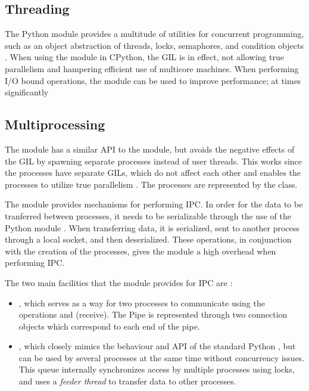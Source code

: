 \subsection{Threading}
The Python  module provides a multitude of utilities for concurrent programming, such as an object abstraction of
threads, locks, semaphores, and condition objects \cite{16_1thtip2d}. When using the  module in CPython, the GIL is in
effect, not allowing true parallelism and hampering efficient use of multicore machines. When performing I/O bound operations, the
 module can be used to improve performance; at times significantly \cite[p. 121-124]{slatkin_2015_effective_ep5swtwbp}

\subsection{Multiprocessing}
The  module has a similar API to the  module, but avoids the negative effects of the GIL by spawning
separate processes instead of user threads. This works since the processes have separate GILs, which do not affect each other and
enables the processes to utilize true parallelism \cite{slatkin_2015_effective_ep5swtwbp}. The processes are represented by the  class.

The  module provides mechanisms for performing IPC.
In order for the data to be tranferred between processes, it needs to be serializable through the use of the Python 
module \cite[p. 143]{slatkin_2015_effective_ep5swtwbp}. When transferring data, it is serialized, sent to another process through
a local socket, and then deserialized. These operations, in conjunction with the creation of the processes, gives the
 module a high overhead when performing IPC.

The two main facilities that the  module provides for IPC are \cite{palach_2014_parallel_ppwp}:
\begin{itemize}
  \item {}, which serves as a way for two processes to communicate using the operations 
    and  (receive). The Pipe is represented through two connection objects which correspond to each end of the pipe.
  \item {}, which closely mimics the behaviour and API of the standard Python , but
    can be used by several processes at the same time without concurrency issues. This  queue internally
    synchronizes access by multiple processes using locks, and uses a \emph{feeder thread} to transfer data to other processes.
\end{itemize}

